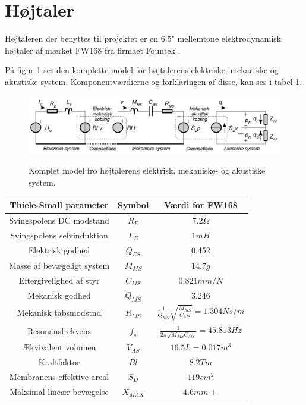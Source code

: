 \section{Højtaler}


Højtaleren der benyttes til projektet er en 6.5" mellemtone elektrodynamisk højtaler af mærket FW168\cite{FW168} fra firmaet Fountek \cite{Fountek}. 

På figur \ref{fig:kompletmodel} ses den komplette model for højtalerens elektriske, mekaniske og akustiske system.\citep{Elektroakustik} Komponentværdierne og forklaringen af disse, kan ses i tabel \ref{tab:TS}.

\begin{figure}[H]
	\centering
	\includegraphics[width=\textwidth]{Pics/kompletmodel.PNG}
	\label{fig:kompletmodel}
	\caption{Komplet model fro højtalerens elektrisk, mekaniske- og akustiske system. } 
\end{figure}

\begin{table}
	\centering
	\begin{tabular}[C]{|c|c|c|}
		
		
		\hline	
		\textbf{Thiele-Small parameter} & \textbf{Symbol} & \textbf{Værdi for FW168} \\\hline
		Svingspolens DC modstand & $R_E$ & $7.2\Omega$ \\\hline
		Svingspolens selvinduktion & $L_E$ & $1mH$  \\\hline
		Elektrisk godhed & $Q_{ES}$ & 0.452 \\\hline
		Masse af bevægeligt system & $M_{MS}$ & $14.7g$  \\\hline
		Eftergivelighed af styr & $C_{MS}$ & $0.821mm/N$  \\\hline
		Mekanisk godhed & $Q_{MS}$ & 3.246  \\\hline
		Mekanisk tabsmodstnd & $R_{MS}$ & \( \frac{1}{Q_{MS}}\sqrt{\frac{M_{MS}}{C_{MS}}}=1.304Ns/m \)  \\\hline
		Resonansfrekvens & $f_s$ & \( \frac{1}{2\pi\sqrt{M_{MS} C_{MS}}}=45.813Hz \) \\\hline
		
		
		Ækvivalent volumen & $ V_{AS} $ & $16.5L=0.017m^3$ \\\hline
		Kraftfaktor & $Bl$ & $8.2Tm$ \\\hline
		Membranens effektive areal & $S_D$ & $119cm^2$ \\\hline
		Maksimal lineær bevægelse & $X_{MAX}$ & $4.6mm\pm$ \\\hline
		
	\end{tabular}
	\label{tab:TS}
\end{table}

